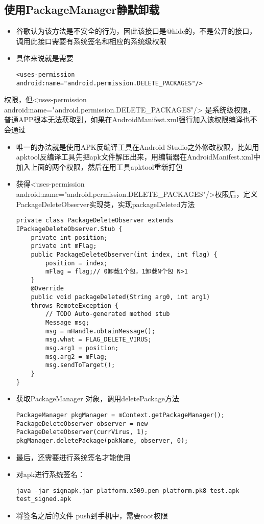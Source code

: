 \documentclass[9pt, b5paper]{article}
\begin{document}
\subsection{使用PackageManager静默卸载}
\label{sec-6-2}
\begin{itemize}
\item 谷歌认为该方法是不安全的行为，因此该接口是@hide的，不是公开的接口，调用此接口需要有系统签名和相应的系统级权限
\item 具体来说就是需要 
\begin{verbatim}
<uses-permission android:name="android.permission.DELETE_PACKAGES"/>
\end{verbatim}
\end{itemize}
权限，但<uses-permission android:name="android.permission.DELETE\_PACKAGES"/> 是系统级权限，普通APP根本无法获取到，如果在AndroidManifest.xml强行加入该权限编译也不会通过
\begin{itemize}
\item 唯一的办法就是使用APK反编译工具在Android Studio之外修改权限，比如用apktool反编译工具先把apk文件解压出来，用编辑器在AndroidManifest.xml中加入上面的两个权限，然后在用工具apktool重新打包
\item 获得<uses-permission android:name="android.permission.DELETE\_PACKAGES"/>权限后，定义PackageDeleteObserver实现类，实现packageDeleted方法
\begin{verbatim}
private class PackageDeleteObserver extends IPackageDeleteObserver.Stub {  
    private int position;  
    private int mFlag;  
    public PackageDeleteObserver(int index, int flag) {  
        position = index;  
        mFlag = flag;// 0卸载1个包，1卸载N个包 N>1  
    }  
    @Override  
    public void packageDeleted(String arg0, int arg1)  
    throws RemoteException {  
        // TODO Auto-generated method stub 
        Message msg;  
        msg = mHandle.obtainMessage();  
        msg.what = FLAG_DELETE_VIRUS;  
        msg.arg1 = position;  
        msg.arg2 = mFlag;  
        msg.sendToTarget();  
    }  
}
\end{verbatim}
\item 获取PackageManager 对象，调用deletePackage方法
\begin{verbatim}
PackageManager pkgManager = mContext.getPackageManager();  
PackageDeleteObserver observer = new PackageDeleteObserver(currVirus, 1);  
pkgManager.deletePackage(pakName, observer, 0);
\end{verbatim}
\item 最后，还需要进行系统签名才能使用
\item 对apk进行系统签名：
\begin{verbatim}
java -jar signapk.jar platform.x509.pem platform.pk8 test.apk test_signed.apk
\end{verbatim}
\item 将签名之后的文件 push到手机中，需要root权限
\end{itemize}
\end{document}

